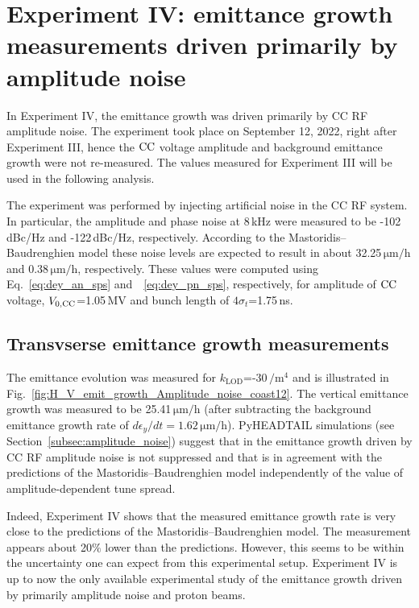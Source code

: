\section{Experiment IV: emittance growth measurements driven primarily by amplitude noise}\label{sec:exp4_amplitude_noise}

In Experiment IV, the emittance growth was driven primarily by CC RF amplitude noise. The experiment took place on September 12, 2022, right after Experiment III, hence the ${\mathrm{CC}}$ voltage amplitude and background emittance growth were not re-measured. The values measured for Experiment III will be used in the following analysis.

The experiment was performed by injecting artificial noise in the CC RF system. In particular, the amplitude and phase noise at 8\,kHz were measured to be -102\,dBc/Hz and -122\,dBc/Hz, respectively. According to the Mastoridis--Baudrenghien model these noise levels are expected to result in about 32.25\,$\mathrm{\mu m/h}$ and 0.38\,$\mathrm{\mu m/h}$, respectively. These values were computed using Eq.~\eqref{eq:dey_an_sps} and~~\eqref{eq:dey_pn_sps}, respectively, for amplitude of ${\mathrm{CC}}$ voltage, ${V_\mathrm{0, CC}}$=1.05\,MV and bunch length of $4 \sigma_t$=1.75\,ns.

\subsection{Transvserse emittance growth measurements}
The emittance evolution was measured for $k_\mathrm{LOD}$=-30\,$\mathrm{/m^4}$ and is illustrated in Fig.~\ref{fig:H_V_emit_growth_Amplitude_noise_coast12}. The vertical emittance growth was measured to be 25.41\,$\mathrm{\mu m/h}$ (after subtracting the background emittance growth rate of $d\epsilon_y/dt = 1.62$\,$\mathrm{\mu m/h}$). PyHEADTAIL simulations (see Section~\ref{subsec:amplitude_noise}) suggest that in the emittance growth driven by CC RF amplitude noise is not suppressed and that is in agreement with the predictions of the Mastoridis--Baudrenghien model independently of the value of amplitude-dependent tune spread. 

Indeed, Experiment IV shows that the measured emittance growth rate is very close to the predictions of the Mastoridis--Baudrenghien model. The measurement appears about 20$\%$ lower than the predictions. However, this seems to be within the uncertainty one can expect from this experimental setup. Experiment IV is up to now the only available experimental study of the emittance growth driven by primarily amplitude noise and proton beams.


